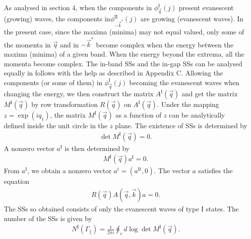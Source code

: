 \documentclass[aps,pra,amsmath,twocolumn,showpacs,bibnotes,10pt]{revtex4-1}
\begin{document}
As analysed in section 4, when the components in $\phi^{\text{I}}_{\vec q}(j)$ present evanescent (growing) waves, the components in$\phi^{\text{II}}_{-\vec k^{\ast}}(j)$ are growing (evanescent waves). In the present case, since the maxima (minima) may not equal valued, only some of the momenta in $\vec q$ and in $-\vec k^{\ast}$ become complex when the energy between the maxima (minima) of a given band. When the energy beyond the extrema, all the momenta become complex. The in-band SSs and the in-gap SSs can be analysed equally in follows with the help as described in Appendix C. Allowing the components (or some of them) in $\phi^{\text{I}}_{\vec q}(j)$ becoming the evanescent waves when changing the energy, we then construct the matrix $A^{\text{I}}({\vec q})$ and get the matrix $M^{\text{I}}({\vec q})$ by row transformation $R(\vec q)$ on $A^{\text{I}}({\vec q})$. Under the mapping $z = \exp(iq_1)$, the matrix $M^{\text{I}}(\vec q)$ as a function of $z$ can be analytically defined inside the unit circle in the $z$ plane. The existence of SSs is determined by 
\begin{eqnarray}
\det M^{\text{I}}(\vec q) = 0.  \nonumber 
\end{eqnarray}
A nonzero vector $a^{\text{I}}$ is then determined by
\begin{eqnarray}
M^{\text{I}}(\vec q) a^{\text{I}}= 0.  \nonumber 
\end{eqnarray}
From $a^{\text{I}}$, we obtain a nonzero vector $a^t = (a^{\text{I}t},0)$. The vector $a$ satisfies the equation
\begin{eqnarray}
R(\vec q)A(\vec q,\vec k) a= 0.  \nonumber 
\end{eqnarray}
The SSs so obtained consists of only the evanescent waves of type I states. The number of the SSs is given by 
\begin{eqnarray}
N^{\text{I}}(\Gamma_{\parallel}) = \frac{1}{2\pi i}\oint_{c}d\log \det M^{\text{I}}(\vec q).  \nonumber
\end{eqnarray}
\end{document}
